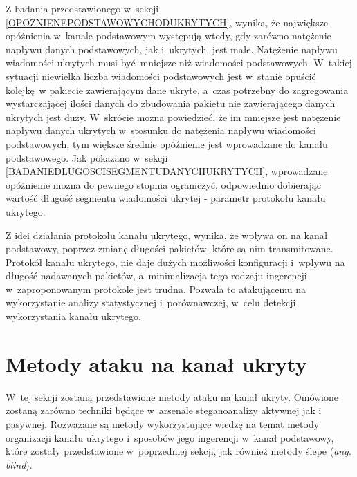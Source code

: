 \documentclass[a4paper, twoside, 12pt]{report}
\begin{document}
        Z badania przedstawionego w~sekcji \ref{OPOZNIENEPODSTAWOWYCHODUKRYTYCH},
        wynika, że największe opóźnienia w~kanale podstawowym
        występują wtedy, gdy zarówno natężenie napływu danych podstawowych, jak i~ukrytych, jest małe.
        Natężenie napływu wiadomości ukrytych musi być mniejsze niż wiadomości podstawowych.
        W~takiej sytuacji niewielka liczba wiadomości podstawowych jest w~stanie
        opuścić kolejkę w pakiecie zawierającym dane ukryte, a~czas potrzebny do
        zagregowania wystarczającej ilości danych do zbudowania pakietu nie
        zawierającego danych ukrytych jest duży. W~skrócie można powiedzieć, że
        im mniejsze jest natężenie napływu danych ukrytych w~stosunku do natężenia
        napływu wiadomości podstawowych, tym większe średnie opóźnienie jest wprowadzane
        do kanału podstawowego. Jak pokazano w~sekcji \ref{BADANIEDLUGOSCISEGMENTUDANYCHUKRYTYCH},
        wprowadzane opóźnienie można do pewnego stopnia ograniczyć, odpowiednio
        dobierając wartość długość segmentu wiadomości ukrytej - parametr protokołu
        kanału ukrytego.

        Z idei działania protokołu kanału ukrytego, wynika, że wpływa on na kanał
        podstawowy, poprzez zmianę długości pakietów, które są nim transmitowane.
        Protokół kanału ukrytego, nie daje dużych możliwości konfiguracji i~wpływu
        na długość nadawanych pakietów, a~minimalizacja tego rodzaju ingerencji
        w~zaproponowanym protokole jest trudna. Pozwala to atakującemu
        na wykorzystanie analizy statystycznej i~porównawczej, w~celu detekcji
        wykorzystania kanału ukrytego.

    \section{Metody ataku na kanał ukryty}
       W~tej sekcji zostaną przedstawione metody ataku na kanał ukryty. Omówione
       zostaną zarówno techniki będące w~arsenale steganoanalizy aktywnej jak i
       pasywnej. Rozważane są metody wykorzystujące wiedzę na temat metody organizacji kanału ukrytego
       i~sposobów jego ingerencji w~kanał podstawowy, które zostały przedstawione w~poprzedniej sekcji,
       jak również metody ślepe (\emph{ang. blind}).
\end{document}
